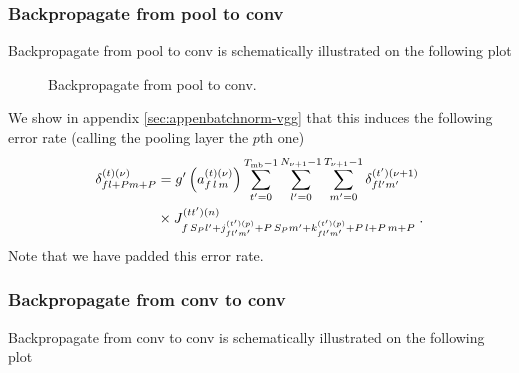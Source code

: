 \subsubsection{Backpropagate from pool to conv}

Backpropagate from pool to conv is schematically illustrated on the following plot

\begin{figure}[H]
\begin{center}
\caption{Backpropagate from pool to conv.}
\end{center}
\end{figure}
We show in appendix \ref{sec:appenbatchnorm-vgg} that this induces the following error rate (calling the pooling layer the $p$th one)
\begin{align}
\delta^{(t)(\nu)}_{fl+Pm+P}&=g'\left(a_{f\,l\,m}^{(t)(\nu)}\right)
%
\sum_{t'=0}^{T_{{\rm mb}}-1}\sum^{N_{\nu+1}-1}_{l'=0}\sum^{T_{\nu+1}-1}_{m'=0}\delta_{fl'm'}^{(t')(\nu+1)}\notag\\
%
&\times J^{(tt')(n)}_{f\,S_P l'+j_{fl'm'}^{(t')(p)}+P\,S_Pm'+k_{fl'm'}^{(t')(p)}+P\,l+P\,m+P}\;.
\end{align}
Note that we have padded this error rate.

\subsubsection{Backpropagate from conv to conv}

Backpropagate from conv to conv is schematically illustrated on the following plot

